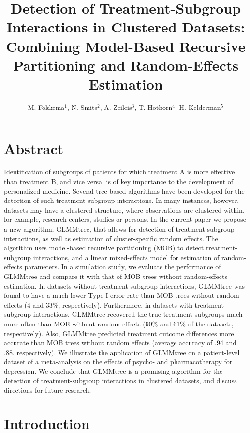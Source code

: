 \documentclass[nobf,doc]{apa}
\title{Detection of Treatment-Subgroup Interactions in Clustered Datasets: Combining Model-Based Recursive Partitioning and Random-Effects Estimation}
\author{M. Fokkema$^1$, N. Smits$^2$, A. Zeileis$^3$, T. Hothorn$^4$, H. Kelderman$^5$}
\affiliation{$^1$Universiteit Leiden, $^2$Universiteit van Amsterdam, $^3$Universit\"{a}t Innsbruck, $^4$Universit\"{a}t Z\"{u}rich, $^5$Universiteit Leiden and Vrije Universiteit, Amsterdam}
\begin{document}
\maketitle
\pagewiselinenumbers

\section{Abstract}
Identification of subgroups of patients for which treatment A is more effective than treatment B, and vice versa, is of key importance to the development of personalized medicine. Several tree-based algorithms have been developed for the detection of such treatment-subgroup interactions. In many instances, however, datasets may have a clustered structure, where observations are clustered within, for example, research centers, studies or persons. In the current paper we propose a new algorithm, GLMMtree, that allows for detection of treatment-subgroup interactions, as well as estimation of cluster-specific random effects. The algorithm uses model-based recursive partitioning (MOB) to detect treatment-subgroup interactions, and a linear mixed-effects model for estimation of random-effects parameters. In a simulation study, we evaluate the performance of GLMMtree and compare it with that of MOB trees without random-effects estimation. In datasets without treatment-subgroup interactions, GLMMtree was found to have a much lower Type I error rate than MOB trees without random effects (4 and 33\%, respectively). Furthermore, in datasets with treatment-subgroup interactions, GLMMtree recovered the true treatment subgroups much more often than MOB without random effects (90\% and 61\% of the datasets, respectively). Also, GLMMtree predicted treatment outcome differences more accurate than MOB trees without random effects (average accuracy of .94 and .88, respectively). We illustrate the application of GLMMtree on a patient-level dataset of a meta-analysis on the effects of psycho- and pharmacotherapy for depression. We conclude that GLMMtree is a promising algorithm for the detection of treatment-subgroup interactions in clustered datasets, and discuss directions for future research.


\section{Introduction}
\end{document}

